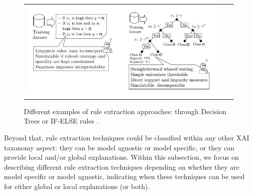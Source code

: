 \begin{figure}[h!]
\centering
 \begin{tabular}{c@{\qquad}c@{\qquad}c}
\includegraphics[width=0.8\columnwidth]{figures/RuleExtractionExamples.JPG}
  \end{tabular} 
  \caption{Different examples of rule extraction approaches: through Decision Trees or IF-ELSE rules \parencite{arrieta2020explainable}.\label{fig:RuleExtractionExamples}}
\end{figure}

Beyond that, rule extraction techniques could be classified within any other XAI taxonomy aspect: they can be model agnostic or model specific, or they can provide local and/or global explanations. Within this subsection, we focus on describing different rule extraction techniques depending on whether they are model specific or model agnostic, indicating when these techniques can be used for either global or local explanations (or both).

